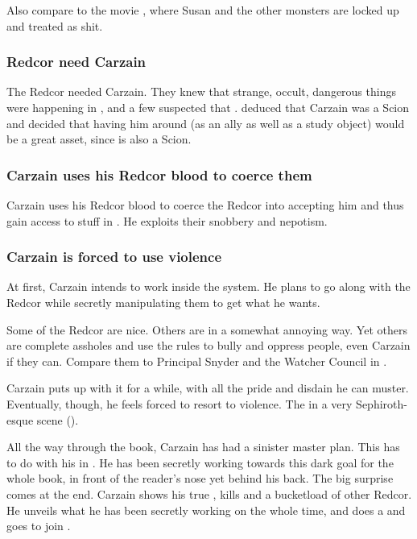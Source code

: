 Also compare to the movie \cite{Movie:MonstersVersusAliens}, where Susan and the other monsters are locked up and treated as shit. 





\subsubsection{Redcor need Carzain}
The Redcor needed Carzain. 
They knew that strange, occult, dangerous things were happening in \Redce, and a few suspected that . 
\Esmerel deduced that Carzain was a Scion and decided that having him around (as an ally as well as a study object) would be a great asset, since \Belzir is also a Scion. 





\subsubsection{Carzain uses his Redcor blood to coerce them}
Carzain uses his Redcor blood to coerce the Redcor into accepting him and thus gain access to stuff in \Redce. 
He exploits their snobbery and nepotism.





\subsubsection{Carzain is forced to use violence}
At first, Carzain intends to work inside the system.
He plans to go along with the Redcor while secretly manipulating them to get what he wants. 

Some of the Redcor are nice.
Others are  in a somewhat annoying way. 
Yet others are complete assholes and use the rules to bully and oppress people, even Carzain if they can. 
Compare them to Principal Snyder and the Watcher Council in \cite{TV:Buffy}. 

Carzain puts up with it for a while, with all the pride and disdain he can muster.
Eventually, though, he feels forced to resort to violence.
The  in a very Sephiroth-esque scene (\cite{VideoGame:FinalFantasyVII}). 

All the way through the book, Carzain has had a sinister master plan.
This has to do with his  in \TwilightAngelRememberEmph. 
He has been secretly working towards this dark goal for the whole book, in front of the reader's nose yet behind his back. 
The big surprise comes at the end. 
Carzain shows his true \colours, kills \Racel and a bucketload of other Redcor. 
He unveils what he has been secretly working on the whole time, and does a  and goes to join \Belzir. 

